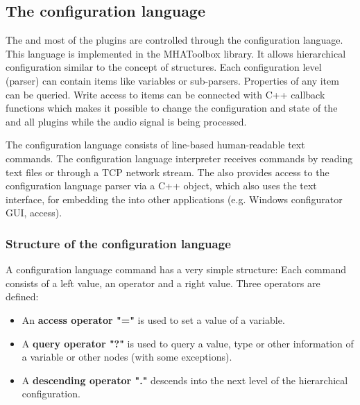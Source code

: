
\subsection{The \mha{} configuration language}
\label{sec:script}

The \mhad{} and most of the \mha{} plugins are controlled
through the \mha{} configuration language. This language is implemented in the
MHAToolbox library. It allows hierarchical configuration similar to the
concept of \Matlab{} structures. 
Each configuration level (parser)
can contain items like variables or sub-parsers. Properties of any item can be
queried.  Write access to items can be connected with C++ callback functions
which makes it possible to change the configuration and state of the \mha{} 
and all plugins while the audio signal is being processed.

The \mha{} configuration language consists of line-based human-readable
text commands.
The \mha{} configuration language interpreter receives commands by
reading text files or through a TCP network stream.  
The \mha{} also provides access to the configuration language parser via
a C++ object, 
which also uses the text interface,
for embedding the \mha{} into other applications (e.g. Windows \mha{}
configurator GUI, \Matlab{} access).

\subsubsection{Structure of the \mha{} configuration language}

A \mha{} configuration language command has a very simple structure: Each
command consists of a left value, an operator and a
right value. Three operators are defined:

%
%
%
\begin{itemize}
\item An {\bf access operator "="} is used to set a value of a variable.
\item A {\bf query operator "?"}
  is used to query a value, type or other information of a variable or other
  nodes (with some exceptions).
\item A {\bf descending operator "."} descends into the next level of the
  hierarchical \mha{} configuration.
\end{itemize}

